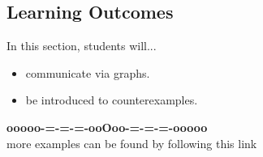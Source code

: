 \documentclass{ximera}
\begin{document}
\subsection*{Learning Outcomes}

\begin{sectionOutcomes}
In this section, students will...

\begin{itemize}
\item communicate via graphs.
\item be introduced to counterexamples.
\end{itemize}
\end{sectionOutcomes}





















\begin{center}
\textbf{\textcolor{green!50!black}{ooooo-=-=-=-ooOoo-=-=-=-ooooo}} \\

more examples can be found by following this link\\ 

\end{center}
\end{document}
